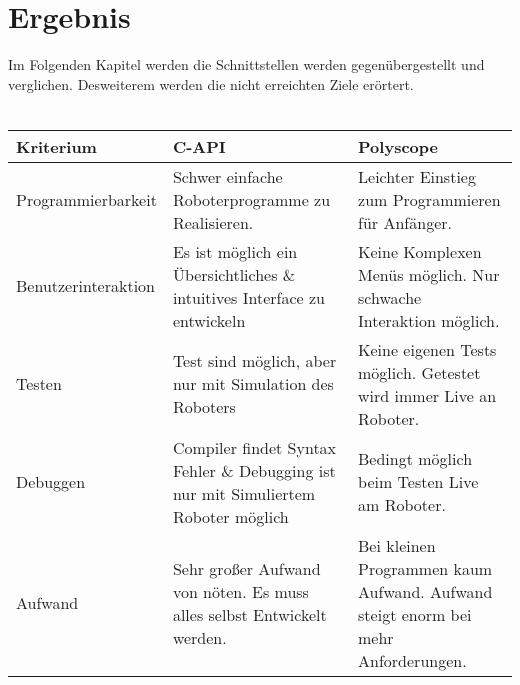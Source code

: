 \chapter{Ergebnis}
\label{sec:ErreichteErgebnisse}

Im Folgenden Kapitel werden die Schnittstellen werden gegenübergestellt und verglichen. Desweiterem werden die nicht erreichten Ziele erörtert.
\\\\
\begin{tabular}{|l|p{}|p{}|}
	\hline
	\textbf{Kriterium} & \textbf{C-API} & \textbf{Polyscope} 
	\\ \hline \hline 
	Programmierbarkeit & Schwer einfache Roboterprogramme zu Realisieren. & Leichter Einstieg zum Programmieren für Anfänger.
	\\ \hline
	Benutzerinteraktion &  Es ist möglich ein Übersichtliches \& intuitives Interface zu entwickeln & 
	Keine Komplexen Menüs möglich. Nur schwache Interaktion möglich.
	\\ \hline
	Testen & Test sind möglich, aber nur mit Simulation des Roboters & Keine eigenen Tests möglich. Getestet wird immer Live an Roboter.
	\\ \hline
	Debuggen & Compiler findet Syntax Fehler \& Debugging ist nur mit Simuliertem Roboter möglich & Bedingt möglich beim Testen Live am Roboter.
	\\ \hline
	Aufwand & Sehr großer Aufwand von nöten. Es muss alles selbst Entwickelt werden. & \label{krit_polyscope_aufwand}
	Bei kleinen Programmen kaum Aufwand. Aufwand steigt enorm bei mehr Anforderungen.\\ \hline
\end{tabular}
\label{tab:vgl_interfaces_first}

